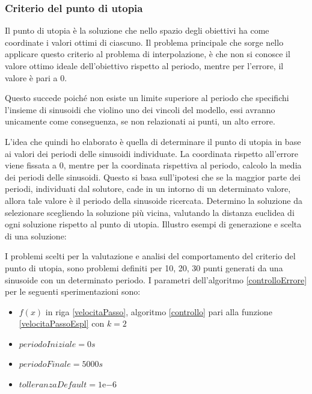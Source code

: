\documentclass[a4paper,12pt]{report}
\newcommand{\expnumber}[2]{{#1}\mathrm{e}{#2}}
\begin{document}
\subsubsection{Criterio del punto di utopia}
\label{ss:utopia}
Il punto di utopia è la soluzione che nello spazio degli obiettivi ha come coordinate i valori ottimi di ciascuno. Il problema principale che sorge nello applicare questo criterio al problema di interpolazione, è che non si conosce il valore ottimo ideale dell'obiettivo rispetto al periodo, mentre per l'errore, il valore è pari a 0.

Questo succede poiché non esiste un limite superiore al periodo che specifichi l'insieme di sinusoidi che violino uno dei vincoli del modello, essi avranno unicamente come conseguenza, se non relazionati ai punti, un alto errore.

L'idea che quindi ho elaborato è quella di determinare il punto di utopia in base ai valori dei periodi delle sinusoidi individuate. La coordinata rispetto all'errore viene fissata a 0, mentre per la coordinata rispettiva al periodo, calcolo la media dei periodi delle sinusoidi. Questo si basa sull'ipotesi che se la maggior parte dei periodi, individuati dal solutore, cade in un intorno di un determinato valore, allora tale valore è il periodo della sinusoide ricercata. Determino la soluzione da selezionare scegliendo la soluzione più vicina, valutando la distanza euclidea di ogni soluzione rispetto al punto di utopia. Illustro esempi di generazione e scelta di una soluzione:

I problemi scelti per la valutazione e analisi del comportamento del criterio del punto di utopia, sono problemi definiti per 10, 20, 30 punti generati da una sinusoide con un determinato periodo.
I parametri dell'algoritmo \ref{controlloErrore} per le seguenti sperimentazioni sono:
\begin{itemize}
  \item $f(x)$ in riga \ref{velocitaPasso}, algoritmo \ref{controllo} pari alla funzione \eqref{velocitaPassoEspl} con $k = 2$
  \item $periodoIniziale = 0s$
  \item $periodoFinale = 5000s$
  \item $tolleranzaDefault = \expnumber{1}{-6}$
\end{itemize}
\end{document}
